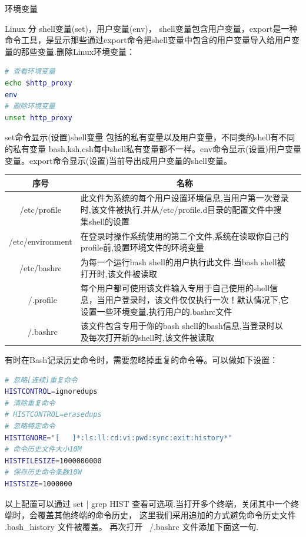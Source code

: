 \documentclass[11pt,fleqn]{book}
\makeatletter
\numberwithin{dummy}{section}
\theoremstyle{ocrenumbox}
\theoremstyle{blacknumex}
\theoremstyle{blacknumbox}
\theoremstyle{ocrenum}
\renewcommand{\subsection}{\@startsection {subsection}{2}{\z@}
	{-3ex \@plus -0.1ex \@minus -.4ex}
	{0.5ex \@plus.2ex }
	{\normalfont\sffamily\bfseries}}
\makeatother
\begin{document}
\subsection{环境变量}

Linux 分 shell变量(set)，用户变量(env)， shell变量包含用户变量，export是一种命令工具，是显示那些通过export命令把shell变量中包含的用户变量导入给用户变量的那些变量.删除Linux环境变量：

\begin{lstlisting}[language=Bash]
# 查看环境变量
echo $http_proxy
env
# 删除环境变量
unset http_proxy
\end{lstlisting}

set命令显示(设置)shell变量 包括的私有变量以及用户变量，不同类的shell有不同的私有变量 bash,ksh,csh每中shell私有变量都不一样。env命令显示(设置)用户变量变量。export命令显示(设置)当前导出成用户变量的shell变量。

\begin{tabular}{cp{8cm}c}
	\hline
	\multirow{1}{*}{序号}
	& \multicolumn{1}{c}{名称}  \\
	\hline			
	/etc/profile  & 此文件为系统的每个用户设置环境信息,当用户第一次登录时,该文件被执行.并从/etc/profile.d目录的配置文件中搜集shell的设置 \\
	\hline	
	/etc/environment & 在登录时操作系统使用的第二个文件,系统在读取你自己的profile前,设置环境文件的环境变量 \\
	\hline
	/etc/bashrc & 为每一个运行bash shell的用户执行此文件.当bash shell被打开时,该文件被读取\\
	\hline
	~/.profile & 每个用户都可使用该文件输入专用于自己使用的shell信息，当用户登录时，该文件仅仅执行一次！默认情况下,它设置一些环境变量,执行用户的.bashrc文件\\
	\hline
	~/.bashrc &  该文件包含专用于你的bash shell的bash信息,当登录时以及每次打开新的shell时,该文件被读取\\
	\hline
\end{tabular}

有时在Bash记录历史命令时，需要忽略掉重复的命令等。可以做如下设置：

\begin{lstlisting}[language=Bash]
# 忽略[连续]重复命令
HISTCONTROL=ignoredups
# 清除重复命令
# HISTCONTROL=erasedups
# 忽略特定命令
HISTIGNORE="[   ]*:ls:ll:cd:vi:pwd:sync:exit:history*"
# 命令历史文件大小10M
HISTFILESIZE=1000000000
# 保存历史命令条数10W
HISTSIZE=1000000
\end{lstlisting}

以上配置可以通过 set | grep HIST 查看可选项.当打开多个终端，关闭其中一个终端时，会覆盖其他终端的命令历史， 这里我们采用追加的方式避免命令历史文件 .bash\_history 文件被覆盖。 再次打开 ~/.bashrc 文件添加下面这一句.
\end{document}
